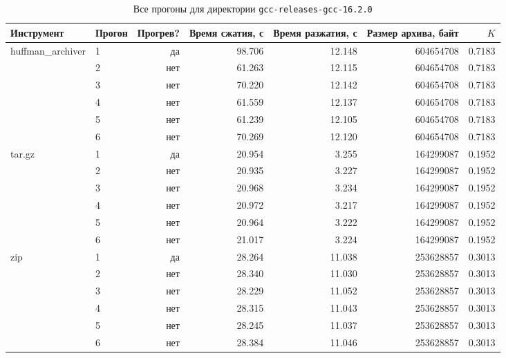 \documentclass[a4paper]{article}
\begin{document}
\begin{table}[h]
\centering
\caption{Все прогоны для директории \texttt{gcc-releases-gcc-16.2.0}}
\label{tab:bench_gcc}
\footnotesize
\begin{tabular}{@{}llrrrrr@{}}
\toprule
Инструмент & Прогон & Прогрев? & Время сжатия, с & Время разжатия, с & Размер архива, байт & \(K\) \\
\midrule
huffman\_archiver & 1 & да  & 98.706 & 12.148 & 604654708 & 0.7183 \\
        & 2 & нет & 61.263 & 12.115 & 604654708 & 0.7183 \\
        & 3 & нет & 70.220 & 12.142 & 604654708 & 0.7183 \\
        & 4 & нет & 61.559 & 12.137 & 604654708 & 0.7183 \\
        & 5 & нет & 61.239 & 12.105 & 604654708 & 0.7183 \\
        & 6 & нет & 70.269 & 12.120 & 604654708 & 0.7183 \\
\addlinespace
tar.gz  & 1 & да  & 20.954 & 3.255 & 164299087 & 0.1952 \\
        & 2 & нет & 20.935 & 3.227 & 164299087 & 0.1952 \\
        & 3 & нет & 20.968 & 3.234 & 164299087 & 0.1952 \\
        & 4 & нет & 20.972 & 3.217 & 164299087 & 0.1952 \\
        & 5 & нет & 20.964 & 3.222 & 164299087 & 0.1952 \\
        & 6 & нет & 21.017 & 3.224 & 164299087 & 0.1952 \\
\addlinespace
zip     & 1 & да  & 28.264 & 11.038 & 253628857 & 0.3013 \\
        & 2 & нет & 28.340 & 11.030 & 253628857 & 0.3013 \\
        & 3 & нет & 28.229 & 11.052 & 253628857 & 0.3013 \\
        & 4 & нет & 28.315 & 11.043 & 253628857 & 0.3013 \\
        & 5 & нет & 28.245 & 11.037 & 253628857 & 0.3013 \\
        & 6 & нет & 28.384 & 11.046 & 253628857 & 0.3013 \\
\bottomrule
\end{tabular}
\end{table}
\end{document}
